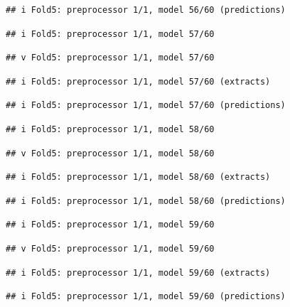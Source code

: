 \documentclass[
]{article}
\begin{document}
\begin{verbatim}
## i Fold5: preprocessor 1/1, model 56/60 (predictions)
\end{verbatim}

\begin{verbatim}
## i Fold5: preprocessor 1/1, model 57/60
\end{verbatim}

\begin{verbatim}
## v Fold5: preprocessor 1/1, model 57/60
\end{verbatim}

\begin{verbatim}
## i Fold5: preprocessor 1/1, model 57/60 (extracts)
\end{verbatim}

\begin{verbatim}
## i Fold5: preprocessor 1/1, model 57/60 (predictions)
\end{verbatim}

\begin{verbatim}
## i Fold5: preprocessor 1/1, model 58/60
\end{verbatim}

\begin{verbatim}
## v Fold5: preprocessor 1/1, model 58/60
\end{verbatim}

\begin{verbatim}
## i Fold5: preprocessor 1/1, model 58/60 (extracts)
\end{verbatim}

\begin{verbatim}
## i Fold5: preprocessor 1/1, model 58/60 (predictions)
\end{verbatim}

\begin{verbatim}
## i Fold5: preprocessor 1/1, model 59/60
\end{verbatim}

\begin{verbatim}
## v Fold5: preprocessor 1/1, model 59/60
\end{verbatim}

\begin{verbatim}
## i Fold5: preprocessor 1/1, model 59/60 (extracts)
\end{verbatim}

\begin{verbatim}
## i Fold5: preprocessor 1/1, model 59/60 (predictions)
\end{verbatim}
\end{document}
